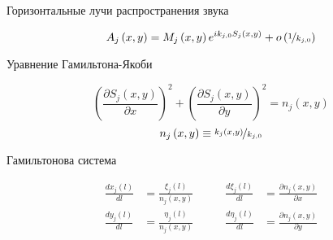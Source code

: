 \documentclass[10pt, unicode]{beamer}
\newif\ifmetropolis
\newcommand{\pa}[1]{\left(#1\right)}
\begin{document}
    \begin{frame}[fragile]{Горизонтальные лучи распространения звука}
        \begin{block}{}
            \ifmetropolis
                \smallskip
            \fi
            \begin{equation}
                A_j\pa{x,y}=M_j\pa{x,y}e^{ik_{j,0}S_j\pa{x,y}}+o\pa{\nicefrac{1}{k_{j,0}}}
            \end{equation}
        \end{block}
        \begin{block}{Уравнение Гамильтона-Якоби}
            \ifmetropolis
                \smallskip
            \fi
            \begin{equation}
                \pa{\frac{\partial S_j\pa{x,y}}{\partial x}}^2+\pa{\frac{\partial S_j\pa{x,y}}{\partial y}}^2=n_j\pa{x,y}
            \end{equation}
            \begin{equation*}
                n_j\pa{x,y}\equiv \nicefrac{k_j\pa{x,y}}{k_{j,0}}
            \end{equation*}
        \end{block}
        \begin{block}{Гамильтонова система}
            \ifmetropolis
                \smallskip
            \fi
            \begin{equation}
                \begin{aligned}
                    \frac{dx_j\pa{l}}{dl}&=\frac{\xi_j\pa{l}}{n_j\pa{x,y}}\qquad&\frac{d\xi_j\pa{l}}{dl}&=\frac{\partial n_j\pa{x,y}}{\partial x}\\
                    \frac{dy_j\pa{l}}{dl}&=\frac{\eta_j\pa{l}}{n_j\pa{x,y}}\qquad&\frac{d\eta_j\pa{l}}{dl}&=\frac{\partial n_j\pa{x,y}}{\partial y}\\
                \end{aligned}
            \end{equation}
        \end{block}
    \end{frame}
    
\end{document}
